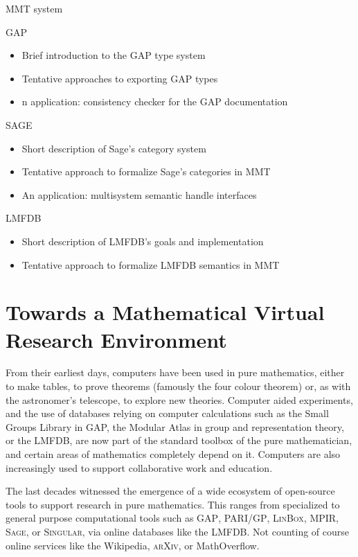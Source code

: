 \documentclass{llncs}
\newcommand{\software}[1]{\textsc{#1}\xspace}
\newcommand{\GAP}{\software{GAP}}
\newcommand{\Singular}{\software{Singular}}
\newcommand{\Sage}{\software{Sage}}
\newcommand{\PariGP}{\software{PARI/GP}}
\newcommand{\Linbox}{\software{LinBox}}
\newcommand{\LMFDB}{\software{LMFDB}}
\newcommand{\MPIR}{\software{MPIR}}
\newcommand{\Arxiv}{\software{arXiv}}
\begin{document}
\begin{description}
\item{MMT system}
\item{GAP} 
\begin{itemize}
\item Brief introduction to the GAP type system 
\item Tentative approaches to exporting GAP types 
\item n application: consistency checker for the GAP documentation
\end{itemize}
\item{SAGE} 
\begin{itemize}
\item Short description of Sage's category system 
\item Tentative approach to formalize Sage's categories in MMT 
\item An application: multisystem semantic handle interfaces
\end{itemize}
\item{LMFDB}
\begin{itemize}
\item Short description of LMFDB's goals and implementation 
\item Tentative approach to formalize LMFDB semantics in MMT
\end{itemize}
\end{description}


\section{Towards a Mathematical Virtual Research Environment}


From their earliest days, computers have been used in pure
mathematics, either to make tables, to prove theorems (famously the
four colour theorem) or, as with the astronomer's telescope, to
explore new theories. Computer aided experiments, and the use of
databases relying on computer calculations such as the Small Groups
Library in GAP, the Modular Atlas in group and representation theory,
or the LMFDB, are now part of the standard toolbox of the pure
mathematician, and certain areas of mathematics completely depend on
it. Computers are also increasingly used to support collaborative work
and education.

The last decades witnessed the emergence of a wide ecosystem of
open-source tools to support research in pure mathematics. This ranges
from specialized to general purpose computational tools such as \GAP,
\PariGP, \Linbox, \MPIR, \Sage, or \Singular, via online databases
like the \LMFDB. Not counting of course online services like the
Wikipedia, \Arxiv, or MathOverflow.
\end{document}
